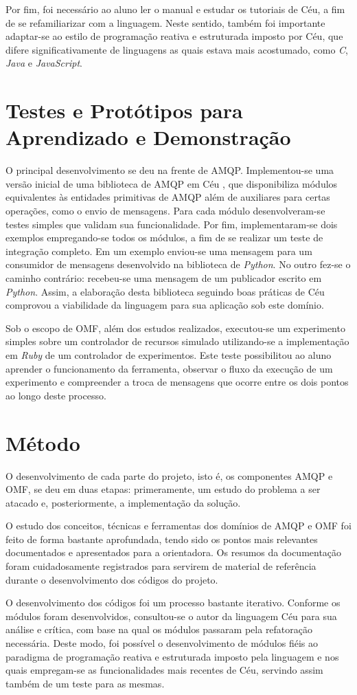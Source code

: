 Por fim, foi necessário ao aluno ler o manual e estudar os tutoriais de Céu, a fim de se refamiliarizar com a linguagem. Neste sentido, também foi importante adaptar-se ao estilo de programação reativa e estruturada imposto por Céu, que difere significativamente de linguagens as quais estava mais acostumado, como \textit{C}, \textit{Java} e \textit{JavaScript}.

\section{Testes e Protótipos para Aprendizado e Demonstração}

O principal desenvolvimento se deu na frente de AMQP. Implementou-se uma versão inicial de uma biblioteca de AMQP em Céu \cite{ceu.rabbitmq}, que disponibiliza módulos equivalentes às entidades primitivas de AMQP além de auxiliares para certas operações, como o envio de mensagens. Para cada módulo desenvolveram-se testes simples que validam sua funcionalidade. Por fim, implementaram-se dois exemplos empregando-se todos os módulos, a fim de se realizar um teste de integração completo. Em um exemplo enviou-se uma mensagem para um consumidor de mensagens desenvolvido na biblioteca de \textit{Python}. No outro fez-se o caminho contrário: recebeu-se uma mensagem de um publicador escrito em \textit{Python}. Assim, a elaboração desta biblioteca seguindo boas práticas de Céu comprovou a viabilidade da linguagem para sua aplicação sob este domínio.

Sob o escopo de OMF, além dos estudos realizados, executou-se um experimento simples sobre um controlador de recursos simulado utilizando-se a implementação em \textit{Ruby} de um controlador de experimentos. Este teste possibilitou ao aluno aprender o funcionamento da ferramenta, observar o fluxo da execução de um experimento e compreender a troca de mensagens que ocorre entre os dois pontos ao longo deste processo. 

\section{Método}

O desenvolvimento de cada parte do projeto, isto é, os componentes AMQP e OMF, se deu em duas etapas: primeramente, um estudo do problema a ser atacado e, posteriormente, a implementação da solução. 

O estudo dos conceitos, técnicas e ferramentas dos domínios de AMQP e OMF foi feito de forma bastante aprofundada, tendo sido os pontos mais relevantes documentados e apresentados para a orientadora. Os resumos da documentação foram cuidadosamente registrados para servirem de material de referência durante o desenvolvimento dos códigos do projeto.

O desenvolvimento dos códigos foi um processo bastante iterativo. Conforme os módulos foram desenvolvidos, consultou-se o autor da linguagem Céu para sua análise e crítica, com base na qual os módulos passaram pela refatoração necessária. Deste modo, foi possível o desenvolvimento de módulos fiéis ao paradigma de programação reativa e estruturada imposto pela linguagem e nos quais empregam-se as funcionalidades mais recentes de Céu, servindo assim também de um teste para as mesmas.
